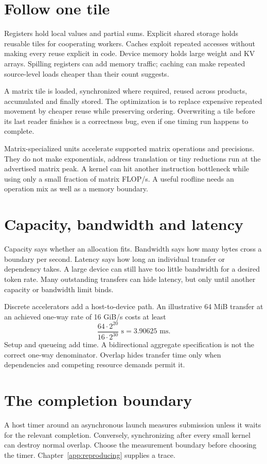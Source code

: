 \section{Follow one tile}
Registers hold local values and partial sums. Explicit shared storage holds
reusable tiles for cooperating workers. Caches exploit repeated accesses
without making every reuse explicit in code. Device memory holds large
weight and KV arrays. Spilling registers can add memory traffic; caching
can make repeated source-level loads cheaper than their count suggests.

A matrix tile is loaded, synchronized where required, reused across
products, accumulated and finally stored. The optimization is to replace
expensive repeated movement by cheaper reuse while preserving ordering.
Overwriting a tile before its last reader finishes is a correctness bug,
even if one timing run happens to complete.

Matrix-specialized units accelerate supported matrix operations and
precisions. They do not make exponentials, address translation or tiny
reductions run at the advertised matrix peak. A kernel can hit another
instruction bottleneck while using only a small fraction of matrix FLOP/s.
A useful roofline needs an operation mix as well as a memory boundary.

\section{Capacity, bandwidth and latency}
Capacity says whether an allocation fits. Bandwidth says how many bytes
cross a boundary per second. Latency says how long an individual transfer
or dependency takes. A large device can still have too little bandwidth
for a desired token rate. Many outstanding transfers can hide latency,
but only until another capacity or bandwidth limit binds.

Discrete accelerators add a host-to-device path. An illustrative 64 MiB
transfer at an achieved one-way rate of 16 GiB/s costs at least
\[
 \frac{64\cdot2^{20}}{16\cdot2^{30}}\text{ s}=3.90625\text{ ms}.
\]
Setup and queueing add time. A bidirectional aggregate specification is
not the correct one-way denominator. Overlap hides transfer time only
when dependencies and competing resource demands permit it.

\section{The completion boundary}
A host timer around an asynchronous launch measures submission unless it
waits for the relevant completion. Conversely, synchronizing after every
small kernel can destroy normal overlap. Choose the measurement boundary
before choosing the timer. Chapter~\ref{app:reproducing} supplies a trace.


